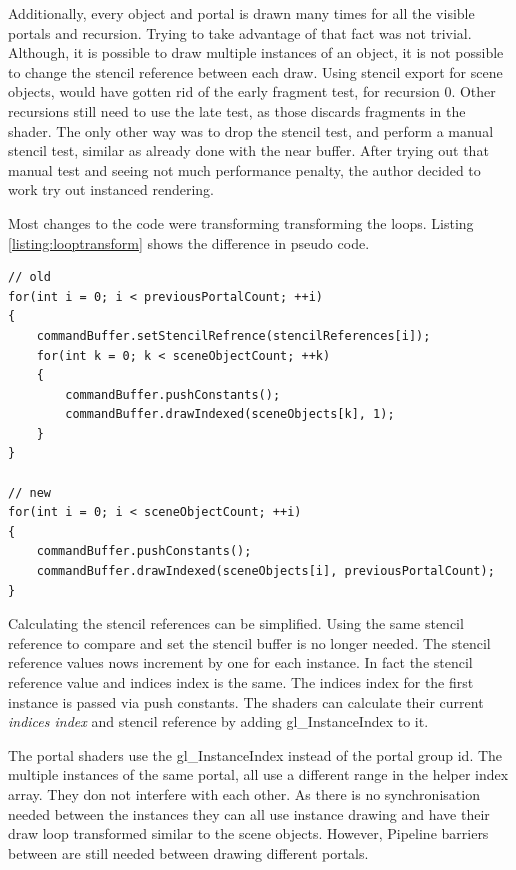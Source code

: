 Additionally, every object and portal is drawn many times for all the visible portals and recursion. Trying to take advantage of that fact was not trivial. Although, it is possible to draw multiple instances of an object, it is not possible to change the stencil reference between each draw. Using stencil export for scene objects, would have gotten rid of the early fragment test, for recursion 0. Other recursions still need to use the late test, as those discards fragments in the shader. The only other way was to drop the stencil test, and perform a manual stencil test, similar as already done with the near buffer. After trying out that manual test and seeing not much performance penalty, the author decided to work try out instanced rendering.

Most changes to the code were transforming transforming the loops. Listing \ref{listing:looptransform} shows the difference in pseudo code.

\begin{lstlisting}[caption={Pseudocode Loop Transformation}, label=listing:looptransform]
// old 
for(int i = 0; i < previousPortalCount; ++i)
{
	commandBuffer.setStencilRefrence(stencilReferences[i]);
	for(int k = 0; k < sceneObjectCount; ++k)
	{
		commandBuffer.pushConstants();
		commandBuffer.drawIndexed(sceneObjects[k], 1);
	}
}

// new
for(int i = 0; i < sceneObjectCount; ++i)
{
	commandBuffer.pushConstants();
	commandBuffer.drawIndexed(sceneObjects[i], previousPortalCount);
}
\end{lstlisting}

Calculating the stencil references can be simplified. Using the same stencil reference to compare and set the stencil buffer is no longer needed. The stencil reference values nows increment by one for each instance. In fact the stencil reference value and indices index is the same. The indices index for the first instance is passed via push constants. The shaders can calculate their current \textit{indices index} and stencil reference by adding gl\_InstanceIndex to it.

The portal shaders use the gl\_InstanceIndex instead of the portal group id. The multiple instances of the same portal, all use a different range in the helper index array. They don not interfere with each other. As there is no synchronisation needed between the instances they can all use instance drawing and have their draw loop transformed similar to the scene objects. However, Pipeline barriers between are still needed between drawing different portals.

